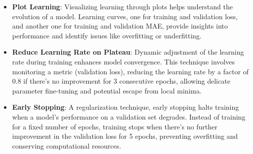 \begin{itemize}
    \item \textbf{Plot Learning}: Visualizing learning through plots helps understand the evolution of a model. Learning curves, one for training and validation loss, and another one for training and validation MAE, provide insights into performance and identify issues like overfitting or underfitting.

    \item \textbf{Reduce Learning Rate on Plateau}: Dynamic adjustment of the learning rate during training enhances model convergence. This technique involves monitoring a metric (validation loss), reducing the learning rate by a factor of 0.8 if there's no improvement for 3 consecutive epochs, allowing delicate parameter fine-tuning and potential escape from local minima.

    \item \textbf{Early Stopping}: A regularization technique, early stopping halts training when a model's performance on a validation set degrades. Instead of training for a fixed number of epochs, training stops when there's no further improvement in the validation loss for 5 epochs, preventing overfitting and conserving computational resources.
\end{itemize}